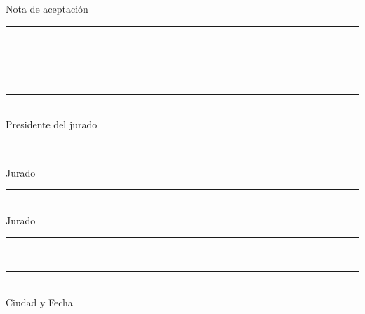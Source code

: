 \documentclass[11pt,lettersize]{article} %
\begin{document}
\begin{flushright}
	Nota de aceptaci\'on\\
	\vspace{1cm}
	\rule{\textwidth}{1pt}\\
	\vspace{1cm}
	\rule{\textwidth}{1pt}\\
	\vspace{1cm}
	\rule{\textwidth}{1pt}\\
	\vspace{1.3cm}
	Presidente del jurado\\
	\vspace{1cm}
	\rule{\textwidth}{1pt}\\
	\vspace{1.3cm}
	Jurado\\
	\vspace{1cm}
	\rule{\textwidth}{1pt}\\
	\vspace{1.3cm}
	Jurado\\
	\vspace{1cm}
	\rule{\textwidth}{1pt}\\
	\vspace{2.5cm}
	\rule{\textwidth}{1pt}\\
	\vspace{.8cm}
	Ciudad y Fecha
\end{flushright}
\thispagestyle{empty}
\pagebreak


\end{document}
